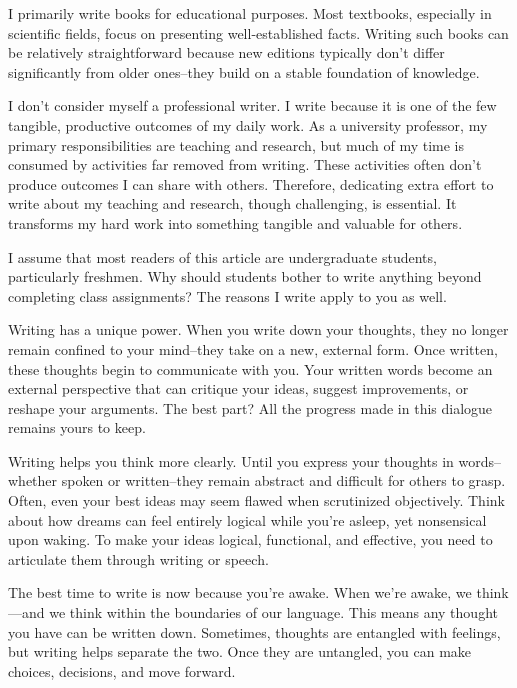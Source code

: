 \documentclass[a4paper]{article}
\begin{document}
I primarily write books for educational purposes. 
Most textbooks, especially in scientific fields, focus on presenting well-established facts. 
Writing such books can be relatively straightforward because new editions typically don't differ significantly from older ones--they build on a stable foundation of knowledge.

I don't consider myself a professional writer. 
I write because it is one of the few tangible, productive outcomes of my daily work. 
As a university professor, my primary responsibilities are teaching and research, but much of my time is consumed by activities far removed from writing. 
These activities often don't produce outcomes I can share with others. 
Therefore, dedicating extra effort to write about my teaching and research, though challenging, is essential. 
It transforms my hard work into something tangible and valuable for others.

I assume that most readers of this article are undergraduate students, particularly freshmen. 
Why should students bother to write anything beyond completing class assignments? 
The reasons I write apply to you as well.

Writing has a unique power. 
When you write down your thoughts, they no longer remain confined to your mind--they take on a new, external form. 
Once written, these thoughts begin to communicate with you. 
Your written words become an external perspective that can critique your ideas, suggest improvements, or reshape your arguments. 
The best part? All the progress made in this dialogue remains yours to keep.

Writing helps you think more clearly. 
Until you express your thoughts in words--whether spoken or written--they remain abstract and difficult for others to grasp. 
Often, even your best ideas may seem flawed when scrutinized objectively. 
Think about how dreams can feel entirely logical while you're asleep, yet nonsensical upon waking. 
To make your ideas logical, functional, and effective, you need to articulate them through writing or speech.


The best time to write is now because you're awake. 
When we're awake, we think—and we think within the boundaries of our language. 
This means any thought you have can be written down. Sometimes, thoughts are entangled with feelings, but writing helps separate the two. 
Once they are untangled, you can make choices, decisions, and move forward.
\end{document}
